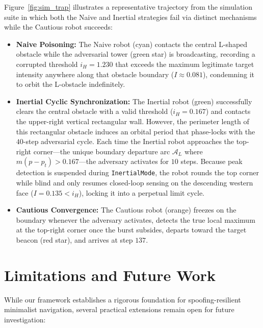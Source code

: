 \documentclass[12pt, a4paper]{article}
\begin{document}
Figure~\ref{fig:sim_trap} illustrates a representative trajectory from the simulation suite in which both the Naive and Inertial strategies fail via distinct mechanisms while the Cautious robot succeeds:
\begin{itemize}
    \item \textbf{Naive Poisoning:} The Naive robot (cyan) contacts the central L-shaped obstacle while the adversarial tower (green star) is broadcasting, recording a corrupted threshold $i_H = 1.230$ that exceeds the maximum legitimate target intensity anywhere along that obstacle boundary ($I \approx 0.081$), condemning it to orbit the L-obstacle indefinitely.
    \item \textbf{Inertial Cyclic Synchronization:} The Inertial robot (green) successfully clears the central obstacle with a valid threshold ($i_H = 0.167$) and contacts the upper-right vertical rectangular wall. However, the perimeter length of this rectangular obstacle induces an orbital period that phase-locks with the $40$-step adversarial cycle. Each time the Inertial robot approaches the top-right corner—the unique boundary departure arc $\mathcal{A}_L$ where $m(p - p_t) > 0.167$—the adversary activates for $10$ steps. Because peak detection is suspended during \texttt{InertialMode}, the robot rounds the top corner while blind and only resumes closed-loop sensing on the descending western face ($I = 0.135 < i_H$), locking it into a perpetual limit cycle.
    \item \textbf{Cautious Convergence:} The Cautious robot (orange) freezes on the boundary whenever the adversary activates, detects the true local maximum at the top-right corner once the burst subsides, departs toward the target beacon (red star), and arrives at step $137$.
\end{itemize}

\section{Limitations and Future Work}
\label{sec:limitations}
While our framework establishes a rigorous foundation for spoofing-resilient minimalist navigation, several practical extensions remain open for future investigation:
\end{document}
